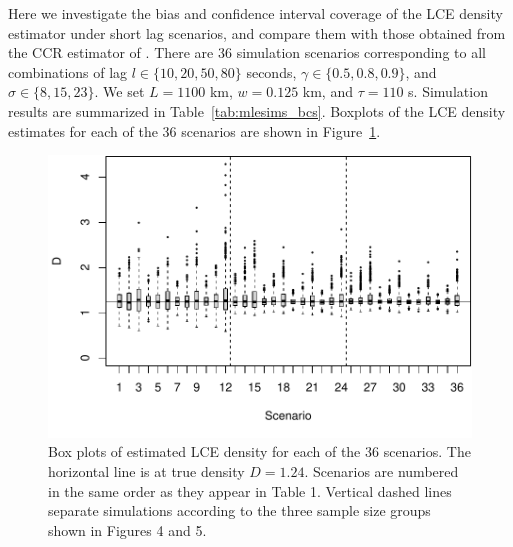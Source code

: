 \documentclass[useAMS, usenatbib, referee]{biom}\usepackage[]{graphicx}\usepackage[]{color}
\makeatletter
\def\maxwidth{ %
  \ifdim\Gin@nat@width>\linewidth
    \linewidth
  \else
    \Gin@nat@width
  \fi
}
\newenvironment{knitrout}{}{} %
\makeatother
\begin{document}
Here we investigate the bias and confidence interval coverage of the LCE density estimator under short lag scenarios, and compare them with those obtained from the CCR estimator of \cite{Stevenson+al:19}. There are 36 simulation scenarios corresponding to all combinations of lag $l \in \{ 10, 20, 50, 80\}$ seconds,  $\gamma \in\{ 0.5, 0.8, 0.9 \}$, and $\sigma\in\{ 8, 15, 23\}$. We set $L = 1100$ km, $w = 0.125$ km, and $\tau = 110$ s. Simulation results are summarized in Table~\ref{tab:mlesims_bcs}. Boxplots of the LCE density estimates for each of the 36 scenarios are shown in Figure~\ref{fig:fig_boxplots_bcs}.


\begin{knitrout}
\color{fgcolor}\begin{figure}

{\centering \includegraphics[width=\maxwidth]{figure/fig_boxplots_bcs-1} 

}

\caption[Box plots of estimated LCE density for each of the 36 scenarios]{Box plots of estimated LCE density for each of the 36 scenarios. The horizontal line is at true density \(D=1.24\). Scenarios are numbered in the same order as they appear in Table 1. Vertical dashed lines separate simulations according to the three sample size groups shown in Figures 4 and 5.}\label{fig:fig_boxplots_bcs}
\end{figure}


\end{knitrout}
\end{document}
